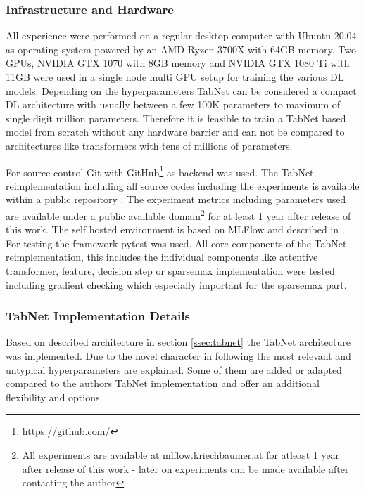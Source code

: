 \documentclass[../main.tex]{subfiles}
\begin{document}
\subsubsection{Infrastructure and Hardware} \label{sssec:infrastructure_and_hardware}

All experience were performed on a regular desktop computer with Ubuntu 20.04 as operating system powered by an AMD Ryzen 3700X with 64GB memory. Two GPUs, NVIDIA GTX 1070 with 8GB memory and NVIDIA GTX 1080 Ti with 11GB were used in a single node multi GPU setup for training the various DL models. Depending on the hyperparameters TabNet can be considered a compact DL architecture with usually between a few 100K parameters to maximum of single digit million parameters. Therefore it is feasible to train a TabNet based model from scratch without any hardware barrier and can not be compared to architectures like transformers with tens of millions of parameters.
\newline

For source control Git with GitHub\footnote{\url{https://github.com/}} as backend was used. The TabNet reimplementation including all source codes including the experiments is available within a public repository \cite{kriechbaumer_clemens33thesis-tex_nodate}. The experiment metrics including parameters used are available under a public available domain\footnote{All experiments are available at \url{mlflow.kriechbaumer.at} for atleast 1 year after release of this work - later on experiments can be made available after contacting the author} for at least 1 year after release of this work. The self hosted environment is based on MLFlow and described in \cite{kriechbaumer_master_nodate}.
For testing the framework pytest \cite{krekel_pytest_2004} was used. All core components of the TabNet reimplementation, this includes the individual components like attentive transformer, feature, decision step or sparsemax implementation were tested including gradient checking which especially important for the sparsemax part. 

\subsubsection{TabNet Implementation Details} \label{sssec:tabnet_implementation_details}

Based on described architecture in section \ref{ssec:tabnet} the TabNet architecture was implemented. Due to the novel character in following the most relevant and untypical hyperparameters are explained. Some of them are added or adapted compared to the authors TabNet implementation \cite{noauthor_google-researchtabnet_nodate} and offer an additional flexibility and options.
\end{document}
